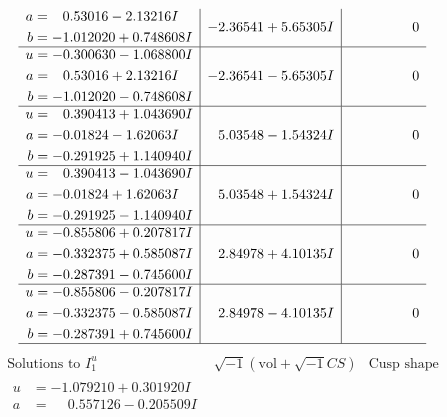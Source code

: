 \documentclass[1p]{elsarticle_modified}
\theoremstyle{definition}
\newcommand{\I}{\sqrt{-1}}
\begin{document}
$$\begin{array}{c|c|c}
\begin{aligned}
a &= \phantom{-}0.53016 - 2.13216 I \\
b &= -1.012020 + 0.748608 I\end{aligned}
 & -2.36541 + 5.65305 I & \phantom{-0.000000 } 0 \\ \hline\begin{aligned}
u &= -0.300630 - 1.068800 I \\
a &= \phantom{-}0.53016 + 2.13216 I \\
b &= -1.012020 - 0.748608 I\end{aligned}
 & -2.36541 - 5.65305 I & \phantom{-0.000000 } 0 \\ \hline\begin{aligned}
u &= \phantom{-}0.390413 + 1.043690 I \\
a &= -0.01824 - 1.62063 I \\
b &= -0.291925 + 1.140940 I\end{aligned}
 & \phantom{-}5.03548 - 1.54324 I & \phantom{-0.000000 } 0 \\ \hline\begin{aligned}
u &= \phantom{-}0.390413 - 1.043690 I \\
a &= -0.01824 + 1.62063 I \\
b &= -0.291925 - 1.140940 I\end{aligned}
 & \phantom{-}5.03548 + 1.54324 I & \phantom{-0.000000 } 0 \\ \hline\begin{aligned}
u &= -0.855806 + 0.207817 I \\
a &= -0.332375 + 0.585087 I \\
b &= -0.287391 - 0.745600 I\end{aligned}
 & \phantom{-}2.84978 + 4.10135 I & \phantom{-0.000000 } 0 \\ \hline\begin{aligned}
u &= -0.855806 - 0.207817 I \\
a &= -0.332375 - 0.585087 I \\
b &= -0.287391 + 0.745600 I\end{aligned}
 & \phantom{-}2.84978 - 4.10135 I & \phantom{-0.000000 } 0\\
 \hline 
 \end{array}$$\newpage$$\begin{array}{c|c|c}  
\text{Solutions to }I^u_{1}& \I (\text{vol} + \sqrt{-1}CS) & \text{Cusp shape}\\
 \hline 
\begin{aligned}
u &= -1.079210 + 0.301920 I \\
a &= \phantom{-}0.557126 - 0.205509 I \\

\end{aligned}
\end{array}$$
\end{document}
